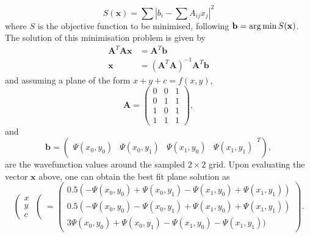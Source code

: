  \begin{equation}
 S(\mathbf{x}) = \displaystyle\sum |b_i - \displaystyle\sum A_{ij} x_j |^2
 \end{equation}
 where $S$ is the objective function to be minimised, following $\mathbf{b} = \operatorname*{arg\,min} S(\mathbf{x})$. The solution of this minimisation problem is given by
\begin{align}
    \mathbf{A} ^{T}\mathbf{A} \mathbf{x} &= \mathbf{A} ^{T}\mathbf{b} \\
    \mathbf{x} &= (\mathbf{A}^{T}\mathbf{A})^{-1}\mathbf{A}^{T}\mathbf{b}
\end{align}
and assuming a plane of the form $x + y + c = f(x,y)$,
\begin{equation}
    \mathbf{A} = \left(
    \begin{array}{ccc}
        0 & 0 & 1 \\
        0 & 1 & 1 \\
        1 & 0 & 1 \\
        1 & 1 & 1
    \end{array}\right),
\end{equation}
and
\begin{equation}
    \mathbf{b} = \left(
    \begin{array}{cccc}
        \Psi(x_0,y_0) & \Psi(x_0,y_1) & \Psi(x_1,y_0) & \Psi(x_1,y_1)
    \end{array}^{T} \right),
\end{equation}
are the wavefunction values around the sampled $2\times 2$ grid.
Upon evaluating the vector $\mathbf{x}$ above, one can obtain the best fit plane  solution as
\begin{equation}\left(
    \begin{array}{c}
        x \\
        y \\
        c
    \end{array}\right(
    = \left(
    \begin{array}{c}
        0.5( -\Psi(x_0,y_0) + \Psi(x_0,y_1) - \Psi(x_1,y_0) + \Psi(x_1,y_1) ) \\
        0.5( -\Psi(x_0,y_0) - \Psi(x_0,y_1) + \Psi(x_1,y_0) + \Psi(x_1,y_1) ) \\
        3\Psi(x_0,y_0) + \Psi(x_0,y_1) - \Psi(x_1,y_0) - \Psi(x_1,y_1) )
    \end{array}\right).
\end{equation}

